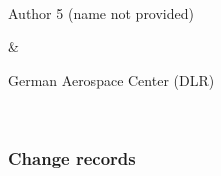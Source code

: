 \documentclass[a4paper,10pt,english]{sphinxmanual}
\begin{document}
\begin{savenotes}
\begin{tabular}[t]{}
\begin{varwidth}[t]{}
\end{varwidth}%
\\
\sphinxhline\begin{varwidth}[t]{}
\sphinxAtStartPar
Author 5 (name not provided)
\sphinxbeforeendvarwidth
\end{varwidth}%
&\begin{varwidth}[t]{}
\sphinxAtStartPar
German Aerospace Center (DLR)
\sphinxbeforeendvarwidth
\end{varwidth}%
\\
\sphinxbottomrule
\end{tabular}
\sphinxtableafterendhook\par
\sphinxattableend\end{savenotes}
\subsubsection*{Change records}
\end{document}
